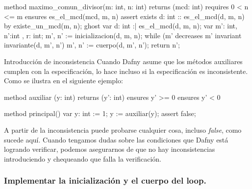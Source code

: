 \documentclass[12pt, a4paper, openany, fleqn]{book}
\begin{document}
    \vspace{1em}
    \begin{greenbox}
    \begin{dafny}[gobble=8]
        method maximo_comun_divisor(m: int, n: int) returns (mcd: int)
            requires 0 < n <= m
            ensures es_el_mcd(mcd, m, n)
        {
            assert exists d: int :: es_el_mcd(d, m, n) by {
                existe_un_mcd(m, n);
            }
            ghost var d: int :| es_el_mcd(d, m, n);
            var m': int, n':int , r: int;
            m', n' := inicializacion(d, m, n);
            while (m' %
                decreases m' %
                invariant invariante(d, m', n')
            {
                m', n' := cuerpo(d, m', n');
            }
            return n';
        }
    \end{dafny}
    \end{greenbox}
    \vspace{1em}


    \begin{warningbox}{Introducción de inconsistencia}
    Cuando Dafny asume que los métodos auxiliares cumplen con la especificación, lo hace incluso si la especificación es inconsistente. Como se ilustra en el siguiente ejemplo:

    \vspace{1em}
    \begin{greenbox}
    \begin{dafny}[gobble=8]
        method auxiliar (y: int) returns (y': int)
            ensures y' >= 0
            ensures y' < 0

        method principal() {
            var y: int := 1;
            y := auxiliar(y);
            assert false;
        }
    \end{dafny}
    \end{greenbox}
    \vspace{1em}

    A partir de la inconsistencia puede probarse cualquier cosa, incluso \textit{false}, como sucede aquí. Cuando tengamos dudas sobre las condiciones que Dafny está logrando verificar, podemos asegurarnos de que no hay inconsistencias introduciendo  y chequeando que falla la verificación.
\end{warningbox}

\subsubsection{Implementar la inicialización y el cuerpo del loop.}
\end{document}
